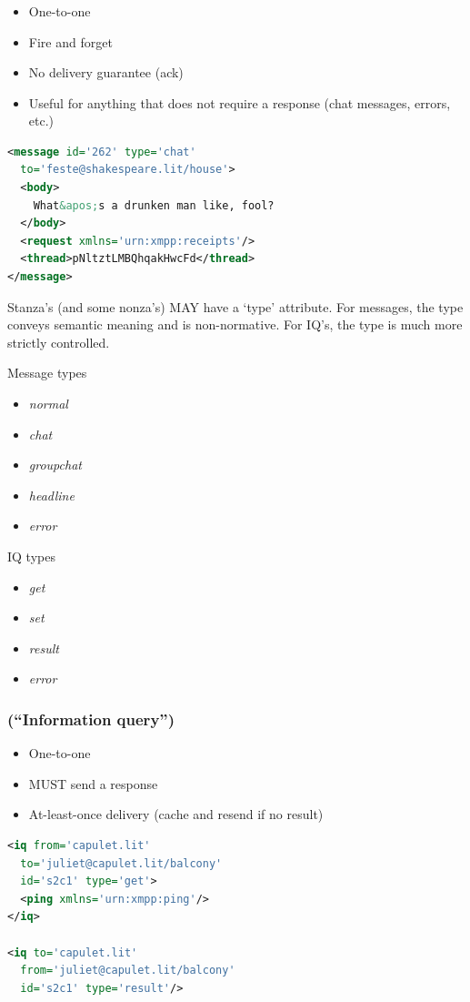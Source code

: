 \documentclass[xelatex,aspectratio=169]{beamer}
\begin{document}
\begin{frame}[fragile]
	\frametitle{}
	\begin{itemize}
	\item One-to-one
	\item Fire and forget
	\item No delivery guarantee (ack)
	\item Useful for anything that does not require a response (chat messages, errors, etc.)
	\end{itemize}
	\begin{lstlisting}[frame=single,language=xml]
<message id='262' type='chat'
  to='feste@shakespeare.lit/house'>
  <body>
    What&apos;s a drunken man like, fool?
  </body>
  <request xmlns='urn:xmpp:receipts'/>
  <thread>pNltztLMBQhqakHwcFd</thread>
</message>
\end{lstlisting}
\end{frame}

\begin{frame}
	Stanza's (and some nonza's) MAY have a `type' attribute. For messages, the
	type conveys semantic meaning and is non-normative. For IQ's, the type is much
	more strictly controlled.
	\begin{multicols}{2}
		Message types
	\begin{itemize}
		\item\textit{normal}
		\item\textit{chat}
		\item\textit{groupchat}
		\item\textit{headline}
		\item\textit{error}
	\end{itemize}
	\columnbreak
	IQ types
	\begin{itemize}
		\item\textit{get}
		\item\textit{set}
		\item\textit{result}
		\item\textit{error}
	\end{itemize}
	\end{multicols}
\end{frame}

\begin{frame}[fragile]
	\frametitle{ (``Information query'')}
		\begin{itemize}
		\item One-to-one
		\item MUST send a response
		\item At-least-once delivery (cache and resend if no result)
		\end{itemize}
\begin{lstlisting}[frame=single,language=xml]
<iq from='capulet.lit'
  to='juliet@capulet.lit/balcony'
  id='s2c1' type='get'>
  <ping xmlns='urn:xmpp:ping'/>
</iq>

<iq to='capulet.lit'
  from='juliet@capulet.lit/balcony'
  id='s2c1' type='result'/>
\end{lstlisting}
\end{frame}
\end{document}
